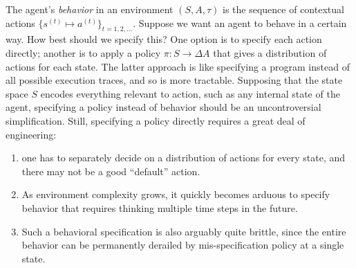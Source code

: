 \documentclass{article}
\begin{document}
    The agent's \emph{behavior} in an environment $(S, A, \tau)$ is the sequence of contextual actions 
    $\{ s^{(t)} \mapsto a^{(t)} \}_{t=1,2,\ldots}$.
    Suppose we want an agent to behave in a certain way. How best should we specify this?
    One option is to specify each action directly; another is to apply a policy $\pi: S \to \Delta A$ that gives a distribution of actions for each state.    
    The latter approach is like specifying a program instead of all possible execution traces, and so is more tractable. 
    Supposing that the state space $S$ encodes everything relevant to action, such as any internal state of the agent, specifying a policy instead of behavior should be an uncontroversial simplification. 
    Still, specifying a policy directly requires a great deal of engineering:
    
    \begin{enumerate}
        \item one has to separately decide on a distribution of actions for every state, and there may not be a good ``default'' action.
        \item  As environment complexity grows, it quickly becomes arduous to specify behavior that requires thinking multiple time steps in the future. 
        \item Such a behavioral specification is also arguably quite brittle, since the entire behavior can be permanently derailed by mis-specification policy at a single state.
    \end{enumerate}
        
\end{document}
